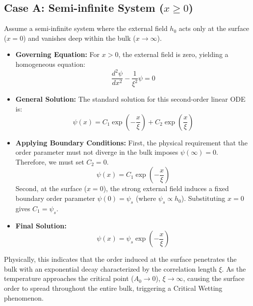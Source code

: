 \documentclass[12pt,a4paper]{article}
\begin{document}
\subsection{Case A: Semi-infinite System ($x \ge 0$)}
Assume a semi-infinite system where the external field $h_0$ acts only at the surface ($x=0$) and vanishes deep within the bulk ($x \to \infty$).
\begin{itemize}
    \item \textbf{Governing Equation:} For $x > 0$, the external field is zero, yielding a homogeneous equation:
    \begin{equation}
        \frac{d^2 \psi}{dx^2} - \frac{1}{\xi^2} \psi = 0
    \end{equation}
    \item \textbf{General Solution:} The standard solution for this second-order linear ODE is:
    \begin{equation}
        \psi(x) = C_1 \exp\left(-\frac{x}{\xi}\right) + C_2 \exp\left(\frac{x}{\xi}\right)
    \end{equation}
    \item \textbf{Applying Boundary Conditions:}
    First, the physical requirement that the order parameter must not diverge in the bulk imposes $\psi(\infty) = 0$. Therefore, we must set $C_2 = 0$.
    \begin{equation}
        \psi(x) = C_1 \exp\left(-\frac{x}{\xi}\right)
    \end{equation}
    Second, at the surface ($x=0$), the strong external field induces a fixed boundary order parameter $\psi(0) = \psi_s$ (where $\psi_s \propto h_0$). Substituting $x=0$ gives $C_1 = \psi_s$.
    \item \textbf{Final Solution:} 
    \begin{equation}
        \psi(x) = \psi_s \exp\left( -\frac{x}{\xi} \right)
    \end{equation}
\end{itemize}
Physically, this indicates that the order induced at the surface penetrates the bulk with an exponential decay characterized by the correlation length $\xi$. As the temperature approaches the critical point ($A_0 \to 0$), $\xi \to \infty$, causing the surface order to spread throughout the entire bulk, triggering a Critical Wetting phenomenon.
\end{document}
